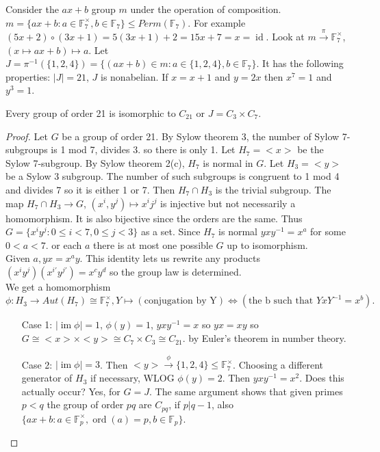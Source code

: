 \documentclass{article}
\DeclareMathOperator{\ord}{ord}
\newcommand{\ra}[1][]{\xrightarrow{#1}}
\DeclareMathOperator{\id}{id}
\DeclareMathOperator{\im}{im}
\begin{document}
\begin{example}
Consider the $ax+b$ group $m$ under the operation of composition. $m=\{ax+b:a\in \mathbb{F}^\times_7,b\in \mathbb{F}_7\}\leq Perm(\mathbb{F}_7)$. For example $(5x+2)\circ (3x+1)=5(3x+1)+2=15x+7=x=\id$. Look at $m\ra[\pi]\mathbb{F}_7^\times$, $(x\mapsto ax+b)\mapsto a$. Let $J=\pi^{-1}(\{1,2,4\})=\{(ax+b)\in m:a\in\{1,2,4\},b\in \mathbb{F}_7\}.$ It has the following properties: $|J|=21$, $J$ is nonabelian. If $x=x+1$ and $y=2x$ then $x^7=1$ and $y^3=1$.
\end{example}
\begin{theorem}
Every group of order 21 is isomorphic to $C_{21}$ or $J=C_3\times C_7$.
\end{theorem}
\begin{proof}
Let $G$ be a group of order 21. By Sylow theorem 3, the number of Sylow 7-subgroups is 1 mod 7, divides 3. so there is only 1. Let $H_7=<x>$ be the Sylow 7-subgroup. By Sylow theorem 2(c), $H_7$ is normal in $G$. Let $H_3=<y>$ be a Sylow 3 subgroup. The number of such subgroups is congruent to 1 mod 4 and divides 7 so it is either 1 or 7. Then $H_7\cap H_3$ is the trivial subgroup. The map $H_7\cap H_3\ra G$, $(x^i,y^j)\mapsto x^ij^j$ is injective but not necessarily a homomorphism. It is also bijective since the orders are the same. Thus $G=\{x^iy^j:0\leq i<7, 0\leq j<3\}$ as a set. Since $H_7$ is normal $yxy^{-1}=x^a$ for some $0<a<7$. or each $a$ there is at most one possible $G$ up to isomorphism.\\
Given $a, yx=x^ay$. This identity lets us rewrite any products $(x^iy^j)(x^{i'}y^{j'})=x^cy^d$ so the group law is determined. \\

We get a homomorphism $\phi:H_3\ra Aut(H_7)\cong \mathbb{F}_7^\times, Y\mapsto (\textrm{conjugation by Y})\iff (\textrm{the b such that }YxY^{-1}=x^b).$
\begin{enumerate}
    \item[Case 1:] $|\im\phi|=1$, $\phi(y)=1$, $yxy^{-1}=x$ so $yx=xy$ so $G\cong <x>\times <y>\cong C_7\times C_3\cong C_21.$ by Euler's theorem in number theory.
    \item[Case 2:] $|\im\phi|=3$. Then $<y>\ra[\phi]\{1,2,4\}\leq \mathbb{F}_7^\times$. Choosing a different generator of $H_3$ if necessary, WLOG $\phi(y)=2$. Then $yxy^{-1}=x^2$. Does this actually occur? Yes, for $G=J$. The same argument shows that given primes $p<q$ the group of order $pq$ are $C_{pq}$, if $p|q-1$, also $\{ax+b:a\in\mathbb{F}_p^\times,\ord(a)=p, b\in\mathbb{F}_p\}$.
\end{enumerate}
\end{proof}
\end{document}
